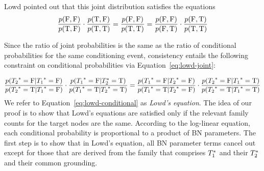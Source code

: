 \documentclass[runningheads,a4paper]{llncs}
\begin{document}
Lowd \cite{Lowd2012} pointed out that this joint distribution satisfies the equations
\begin{equation}  \frac{p(\mathrm{F},\mathrm{F})}{p(\mathrm{T},\mathrm{F})} \cdot \frac{p(\mathrm{T},\mathrm{F})}{p(\mathrm{T},\mathrm{T})}= \frac{p(\mathrm{F},\mathrm{F})}{p(\mathrm{T},\mathrm{T})} = \frac{p(\mathrm{F},\mathrm{F})}{p(\mathrm{F},\mathrm{T})} \cdot \frac{p(\mathrm{F},\mathrm{T})}{p(\mathrm{T},\mathrm{T})} \label{eq:lowd-joint}
\end{equation}

Since the ratio of joint probabilities is the same as the ratio of conditional probabilities for the same conditioning event, consistency entails the following constraint on conditional probabilities via Equation~\eqref{eq:lowd-joint}:

{\small
\begin{equation}
\frac{p({T_{2}}^{*}\hspace{0.0ex}=\mathrm{F}|{T_{1}}^{*}\hspace{0.0ex}=\mathrm{F})}{p({T_{2}}^{*}\hspace{0.0ex} = \mathrm{T}| {T_{1}}^{*}\hspace{0.0ex}=\mathrm{F})} \cdot \frac{p({T_{1}}^{*}\hspace{0.0ex}=\mathrm{F}|{T}_{2}^{*}\hspace{0.0ex}=\mathrm{T})}{p({T_{1}}^{*}\hspace{0.0ex} = \mathrm{T}| {T_{2}}^{*}\hspace{0.0ex}=\mathrm{T})} =\frac{p({T_{1}}^{*}\hspace{0.0ex}=\mathrm{F}|{T_{2}}^{*}\hspace{0.0ex}=\mathrm{F})}{p({T_{1}}^{*}\hspace{0.0ex} = \mathrm{T}| {T_{2}}^{*}\hspace{0.0ex}=\mathrm{F})} \cdot \frac{p({T_{2}}^{*}\hspace{0.0ex}=\mathrm{F}|{T_{1}}^{*}\hspace{0.0ex}=\mathrm{T})}{p({T_{2}}^{*}\hspace{0.0ex} = \mathrm{T}| {T_{1}}^{*}\hspace{0.0ex}=\mathrm{T})} \label{eq:lowd-conditional}
\end{equation}
}We refer to Equation~\ref{eq:lowd-conditional} as {\em Lowd's equation}. 
The idea of our proof is to show that Lowd's equations are satisfied only if the relevant family counts for the target nodes are the same. According to the log-linear equation, each conditional probability is proportional to a product of BN parameters. The first step is to show that in Lowd's equation, all BN parameter terms cancel out except for those that are derived from the family that comprises $T_{1}^{*}\hspace{0.0ex}$ and their $T_{2}^{*}\hspace{0.0ex}$ and their common grounding. 
%
\end{document}
